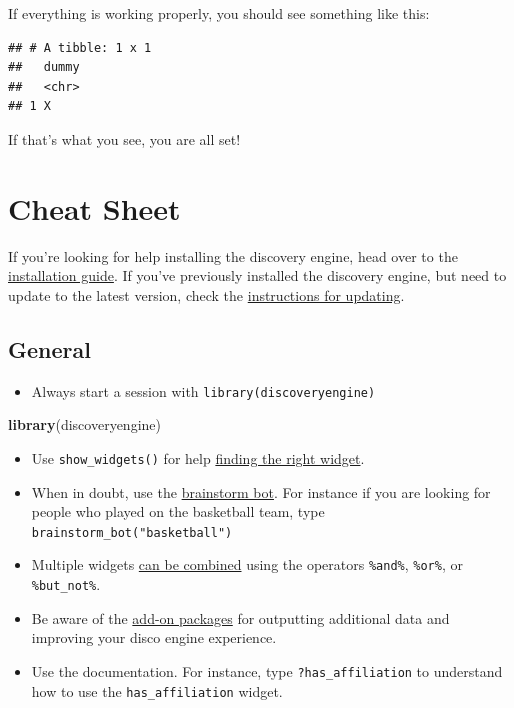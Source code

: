 \documentclass[]{book}
\newenvironment{Shaded}{\begin{snugshade}}{\end{snugshade}}
\newcommand{\KeywordTok}[1]{\textcolor[rgb]{0.13,0.29,0.53}{\textbf{#1}}}
\newcommand{\NormalTok}[1]{#1}
\providecommand{\tightlist}{%
  \setlength{\itemsep}{0pt}\setlength{\parskip}{0pt}}
\begin{document}
If everything is working properly, you should see something like this:

\begin{verbatim}
## # A tibble: 1 x 1
##   dummy
##   <chr>
## 1 X
\end{verbatim}

If that's what you see, you are all set!

\hypertarget{cheat-sheet}{%
\chapter{Cheat Sheet}\label{cheat-sheet}}

If you're looking for help installing the discovery engine, head over to the \href{https://cwolfsonseeley.github.io/discodocs/installation.html}{installation guide}. If you've previously installed the discovery engine, but need to update to the latest version, check the \href{https://cwolfsonseeley.github.io/discodocs/updating.html}{instructions for updating}.

\hypertarget{general}{%
\section{General}\label{general}}

\begin{itemize}
\tightlist
\item
  Always start a session with \texttt{library(discoveryengine)}
\end{itemize}

\begin{Shaded}
\begin{Highlighting}[]
\KeywordTok{library}\NormalTok{(discoveryengine)}
\end{Highlighting}
\end{Shaded}

\begin{itemize}
\tightlist
\item
  Use \texttt{show\_widgets()} for help \protect\hyperlink{working-with-finding-widgets}{finding the right widget}.
\item
  When in doubt, use the \protect\hyperlink{brainstorm-bot}{brainstorm bot}. For instance if you are looking for people who played on the basketball team, type \texttt{brainstorm\_bot("basketball")}
\item
  Multiple widgets \protect\hyperlink{combining-widgets}{can be combined} using the operators \texttt{\%and\%}, \texttt{\%or\%}, or \texttt{\%but\_not\%}.
\item
  Be aware of the \protect\hyperlink{add-on-packages}{add-on packages} for outputting additional data and improving your disco engine experience.
\item
  Use the documentation. For instance, type \texttt{?has\_affiliation} to understand how to use the \texttt{has\_affiliation} widget.
\end{itemize}
\end{document}

